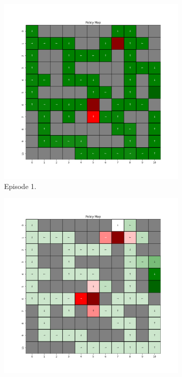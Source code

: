 \documentclass{assignment}
\begin{document}
\begin{figure}[H]
    \begin{subfigure}{0.3\textwidth}
        \includegraphics[width=\textwidth]{figures/policy_td/gamma_sweep/policy_alpha_0.1_gamma_0.5_epsilon_0.2_iteration_1.png}
    \caption{Episode 1.}
    \end{subfigure}\hfill
    \begin{subfigure}{0.3\textwidth}
        \includegraphics[width=\textwidth]{figures/policy_td/gamma_sweep/policy_alpha_0.1_gamma_0.5_epsilon_0.2_iteration_50.png}

\end{subfigure}
\end{figure}
\end{document}
